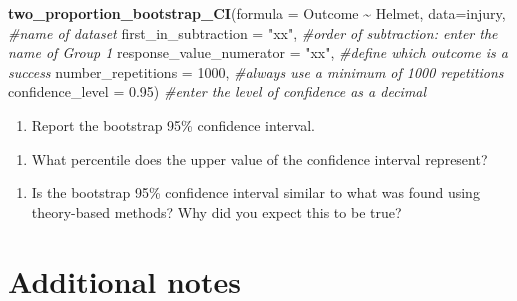\documentclass[
]{report}
\newenvironment{Shaded}{\begin{snugshade}}{\end{snugshade}}
\newcommand{\CommentTok}[1]{\textcolor[rgb]{0.56,0.35,0.01}{\textit{#1}}}
\newcommand{\DataTypeTok}[1]{\textcolor[rgb]{0.13,0.29,0.53}{#1}}
\newcommand{\DecValTok}[1]{\textcolor[rgb]{0.00,0.00,0.81}{#1}}
\newcommand{\FloatTok}[1]{\textcolor[rgb]{0.00,0.00,0.81}{#1}}
\newcommand{\KeywordTok}[1]{\textcolor[rgb]{0.13,0.29,0.53}{\textbf{#1}}}
\newcommand{\NormalTok}[1]{#1}
\newcommand{\OperatorTok}[1]{\textcolor[rgb]{0.81,0.36,0.00}{\textbf{#1}}}
\newcommand{\StringTok}[1]{\textcolor[rgb]{0.31,0.60,0.02}{#1}}
\providecommand{\tightlist}{%
  \setlength{\itemsep}{0pt}\setlength{\parskip}{0pt}}
\begin{document}
\begin{Shaded}
\begin{Highlighting}[]
\KeywordTok{two\_proportion\_bootstrap\_CI}\NormalTok{(}\DataTypeTok{formula =}\NormalTok{ Outcome }\OperatorTok{\textasciitilde{}}\StringTok{ }\NormalTok{Helmet, }
                            \DataTypeTok{data=}\NormalTok{injury, }\CommentTok{\#name of dataset}
                            \DataTypeTok{first\_in\_subtraction =} \StringTok{"xx"}\NormalTok{, }\CommentTok{\#order of subtraction: enter the name of Group 1}
                            \DataTypeTok{response\_value\_numerator =} \StringTok{"xx"}\NormalTok{, }\CommentTok{\#define which outcome is a success }
                            \DataTypeTok{number\_repetitions =} \DecValTok{1000}\NormalTok{, }\CommentTok{\#always use a minimum of 1000 repetitions}
                            \DataTypeTok{confidence\_level =} \FloatTok{0.95}\NormalTok{) }\CommentTok{\#enter the level of confidence as a decimal}
\end{Highlighting}
\end{Shaded}

\begin{enumerate}
\def\labelenumi{\arabic{enumi}.}
\setcounter{enumi}{1}
\tightlist
\item
  Report the bootstrap 95\% confidence interval.
\end{enumerate}

\vspace{0.5in}

\begin{enumerate}
\def\labelenumi{\arabic{enumi}.}
\setcounter{enumi}{2}
\tightlist
\item
  What percentile does the upper value of the confidence interval represent?
\end{enumerate}

\vspace{0.3in}

\begin{enumerate}
\def\labelenumi{\arabic{enumi}.}
\setcounter{enumi}{3}
\tightlist
\item
  Is the bootstrap 95\% confidence interval similar to what was found using theory-based methods? Why did you expect this to be true?
\end{enumerate}

\newpage

\hypertarget{additional-notes}{%
\section{Additional notes}\label{additional-notes}}
\end{document}
